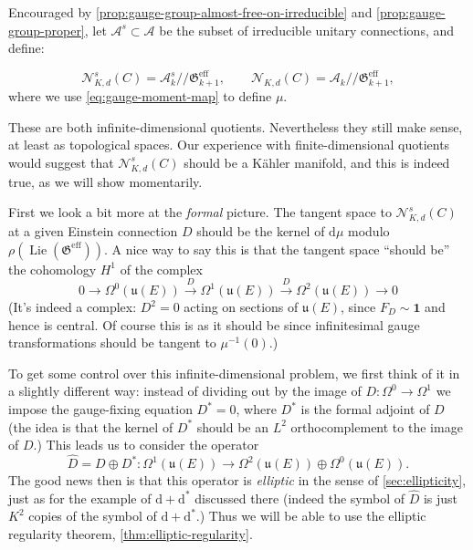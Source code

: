 \documentclass[12pt,letterpaper,reqno]{article}
\numberwithin{equation}{section}
\newcommand{\fu}{{\mathfrak u}}
\newcommand{\fG}{{\mathfrak G}}
\newcommand{\cN}{\ensuremath{\mathcal N}}
\newcommand{\cA}{\ensuremath{\mathcal A}}
\newcommand{\kahler}{K\"ahler\xspace}
\newcommand{\kq}{/\!\!/}
\newcommand\bid{{\mathbf 1}}
\newcommand{\de}{\mathrm{d}}
\newcommand{\eff}{\mathrm{eff}}
\newcommand{\ti}[1]{\textit{#1}}
\DeclareMathOperator{\Lie}{Lie}
\begin{document}
Encouraged by \autoref{prop:gauge-group-almost-free-on-irreducible}
and \autoref{prop:gauge-group-proper}, let $\cA^s \subset \cA$ be the 
subset of irreducible unitary connections, and define:

\begin{defn}
\begin{equation}
  \cN^s_{K,d}(C) = \cA^s_k \kq \fG^\eff_{k+1}, \qquad \cN_{K,d}(C) = \cA_k \kq \fG^\eff_{k+1},
\end{equation}
where we use \eqref{eq:gauge-moment-map} to define $\mu$.
\end{defn}

These are both infinite-dimensional quotients.
Nevertheless they still make sense, at least
as topological spaces. Our experience with finite-dimensional
quotients would suggest that $\cN^s_{K,d}(C)$ should be a \kahler
manifold, and this is indeed true, as we will show momentarily.

First we look a bit more at the \ti{formal} picture.
The tangent space to $\cN_{K,d}^s(C)$
at a given Einstein connection $D$ should be the kernel of $\de \mu$ 
modulo $\rho(\Lie (\fG^\eff))$. A nice way to say this is that 
the tangent space ``should be'' the cohomology $H^1$ of the complex
\begin{equation} \label{eq:gauge-complex}
  0 \to \Omega^0(\fu(E)) \xrightarrow{D} \Omega^1(\fu(E)) \xrightarrow{D} \Omega^2(\fu(E)) \to 0
\end{equation}
(It's indeed a complex: $D^2 = 0$ acting
on sections of $\fu(E)$, since $F_D \sim \bid$ and hence 
is central. Of course this is as it should be since infinitesimal
gauge transformations should be tangent to $\mu^{-1}(0)$.)

To get some control over this infinite-dimensional
problem, we first think of it in a slightly different way:
instead of dividing out by the image of $D: \Omega^0 \to \Omega^1$
we impose the gauge-fixing equation $D^* = 0$, where $D^*$ is the
formal adjoint of $D$
(the idea is that the kernel of $D^*$ should be an $L^2$ 
orthocomplement to the image of $D$.)
This leads us to consider the operator
\begin{equation}
 \hat{D} = D \oplus D^*: \Omega^1(\fu(E)) \to \Omega^2(\fu(E)) \oplus \Omega^0(\fu(E)).
\end{equation}
The good news then is that this operator is \ti{elliptic} in the sense of 
\autoref{sec:ellipticity},
just as for the example of $\de + \de^*$ discussed there
(indeed the symbol of $\hat D$ is just $K^2$ copies of the symbol 
of $\de + \de^*$.)
Thus we will be able to use the elliptic regularity
theorem, \autoref{thm:elliptic-regularity}.
\end{document}
